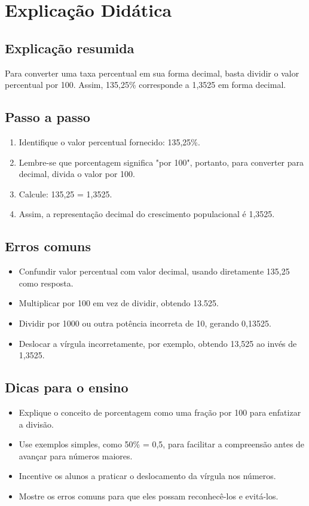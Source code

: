 \documentclass{article}
\begin{document}
\section{Explicação Didática}

\subsection{Explicação resumida}
Para converter uma taxa percentual em sua forma decimal, basta dividir o valor percentual por 100. Assim, 135,25\% corresponde a 1,3525 em forma decimal.

\subsection{Passo a passo}
\begin{enumerate}
  \item Identifique o valor percentual fornecido: 135,25\%.
  \item Lembre-se que porcentagem significa "por 100", portanto, para converter para decimal, divida o valor por 100.
  \item Calcule: 135,25  = 1,3525.
  \item Assim, a representação decimal do crescimento populacional é 1,3525.
\end{enumerate}

\subsection{Erros comuns}
\begin{itemize}
  \item Confundir valor percentual com valor decimal, usando diretamente 135,25 como resposta.
  \item Multiplicar por 100 em vez de dividir, obtendo 13.525.
  \item Dividir por 1000 ou outra potência incorreta de 10, gerando 0,13525.
  \item Deslocar a vírgula incorretamente, por exemplo, obtendo 13,525 ao invés de 1,3525.
\end{itemize}

\subsection{Dicas para o ensino}
\begin{itemize}
  \item Explique o conceito de porcentagem como uma fração por 100 para enfatizar a divisão.
  \item Use exemplos simples, como 50\% = 0,5, para facilitar a compreensão antes de avançar para números maiores.
  \item Incentive os alunos a praticar o deslocamento da vírgula nos números.
  \item Mostre os erros comuns para que eles possam reconhecê-los e evitá-los.
\end{itemize}
\end{document}
